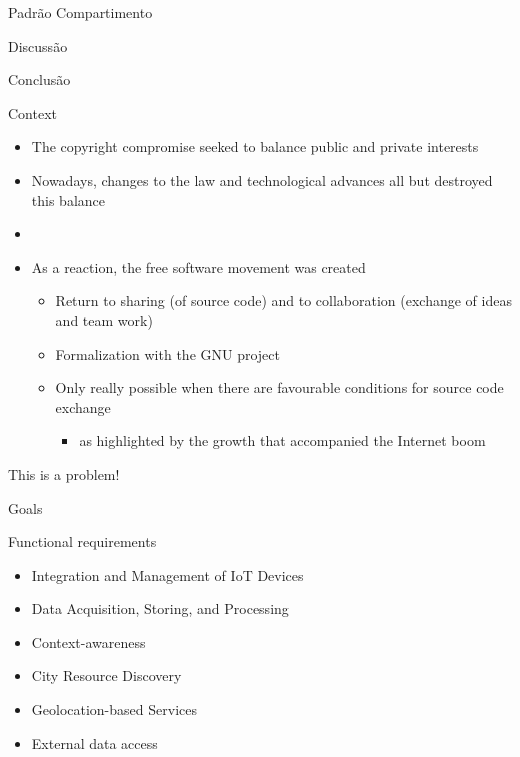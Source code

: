 \documentclass[xcolor={usenames,svgnames,dvipsnames},brazil,english,12pt,aspectratio=149]{beamer}
\begin{document}
\begin{frame}{Padrão Compartimento}
\end{frame}

\begin{frame}{Discussão}
\end{frame}

\begin{frame}{Conclusão}
\end{frame}

\begin{frame}{Context}
  \begin{itemize}
    \item The copyright compromise seeked to balance public and private interests
    \item Nowadays, changes to the law and technological advances all but destroyed this balance
    \item[]
    \item As a reaction, the free software movement was created
    \begin{itemize}
      \item Return to sharing (of source code) and to collaboration (exchange of ideas and team work)
      \item Formalization with the GNU project
      \item Only really possible when there are favourable conditions for source code exchange
      \begin{itemize}
        \item as highlighted by the growth that accompanied the Internet boom
      \end{itemize}
    \end{itemize}
  \end{itemize}

\end{frame}

\begin{frame}[standout]
  This is a problem!
\end{frame}

\begin{frame}{Goals}
  \begin{block}{Functional requirements}
    \begin{itemize}
      \item Integration and Management of \alert{IoT} Devices
      \item Data Acquisition, Storing, and Processing
      \item Context-awareness
      \item City Resource Discovery
      \item Geolocation-based Services
      \item External data access
    \end{itemize}
  \end{block}
\end{frame}
\end{document}
